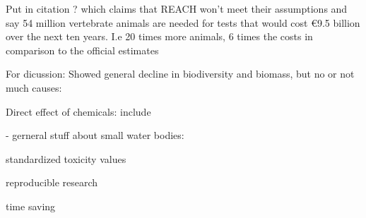 \item Put in citation \citep{hartung_chemical_2009} ? which claims that REACH won't meet their assumptions and say 54 million vertebrate animals are needed for tests that would cost €9.5 billion over the next ten years. I.e 20 times more animals, 6 times the costs in comparison to the official estimates 


For dicussion:
Showed general decline in biodiversity and biomass, but no or not much causes: \citep{butchart_global_2010, hallmann_more_2017, seibold_arthropod_2019} 

Direct effect of chemicals:
include \citep{yamamuro_neonicotinoids_2019} %

- gerneral stuff about small water bodies: \citep{riley_small_2018}


\item standardized toxicity values
    
\item reproducible research %
    
\item time saving
\fi    

\iffalse

